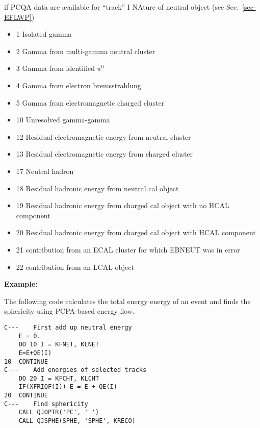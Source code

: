 \begin{indentlist}{ 3.00cm}{ 3.25cm}
 if PCQA data are available for ``track'' I
NAture of neutral object (see Sec.~\ref{sec-EFLWP})
\begin{itemize}
\item 1 Isolated gamma
\item 2 Gamma from multi-gamma neutral cluster
\item 3 Gamma from identified $\pi^0$
\item 4 Gamma from electron bremsstrahlung
\item 5 Gamma from electromagnetic charged cluster
\item 10 Unresolved gamma-gamma
\item 12 Residual electromagnetic energy from neutral cluster
\item 13 Residual electromagnetic energy from charged cluster
\item 17 Neutral hadron
\item 18 Residual hadronic energy from neutral cal object
\item 19 Residual hadronic energy from
charged cal object with no HCAL component
\item 20 Residual hadronic energy from
charged cal object with HCAL component
\item 21 contribution from an ECAL cluster for
which EBNEUT was in error
\item 22 contribution from an LCAL object
 
\end{itemize}
\end{indentlist}
 
{\bf Example:}
 
The following code calculates the total energy energy of an
event and finds the sphericity using PCPA-based energy flow.
 
\begin{verbatim}
C---    First add up neutral energy
    E = 0.
    DO 10 I = KFNET, KLNET
    E=E+QE(I)
10  CONTINUE
C---    Add energies of selected tracks
    DO 20 I = KFCHT, KLCHT
    IF(XFRIQF(I)) E = E + QE(I)
20  CONTINUE
C---    Find sphericity
    CALL QJOPTR('PC', ' ')
    CALL QJSPHE(SPHE, 'SPHE', KRECO)
\end{verbatim}
